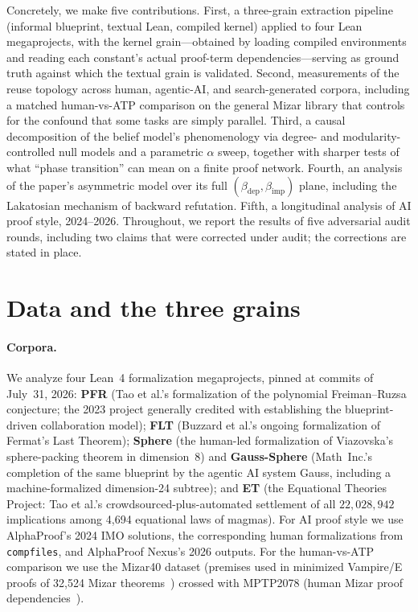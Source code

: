 \documentclass[11pt]{article}
\newcommand{\betadep}{\beta_{\mathrm{dep}}}
\newcommand{\betaimp}{\beta_{\mathrm{imp}}}
\begin{document}
Concretely, we make five contributions. First, a three-grain extraction pipeline (informal
blueprint, textual Lean, compiled kernel) applied to four Lean megaprojects, with the kernel
grain---obtained by loading compiled environments and reading each constant's actual proof-term
dependencies---serving as ground truth against which the textual grain is validated. Second,
measurements of the reuse topology across human, agentic-AI, and search-generated corpora,
including a matched human-vs-ATP comparison on the general Mizar library that controls for the
confound that some tasks are simply parallel. Third, a causal decomposition of the belief
model's phenomenology via degree- and modularity-controlled null models and a parametric
$\alpha$ sweep, together with sharper tests of what ``phase transition'' can mean on a finite
proof network. Fourth, an analysis of the paper's asymmetric model over its full
$(\betadep,\betaimp)$ plane, including the Lakatosian mechanism of backward refutation. Fifth,
a longitudinal analysis of AI proof style, 2024--2026. Throughout, we report the results of five
adversarial audit rounds, including two claims that were corrected under audit; the corrections
are stated in place.

\section{Data and the three grains}
\label{sec:data}

\paragraph{Corpora.} We analyze four Lean~4 formalization megaprojects, pinned at commits of
July~31, 2026: \textbf{PFR} (Tao et al.'s formalization of the polynomial Freiman--Ruzsa
conjecture; the 2023 project generally credited with establishing the blueprint-driven
collaboration model); \textbf{FLT} (Buzzard et al.'s ongoing formalization of Fermat's Last
Theorem); \textbf{Sphere} (the human-led formalization of Viazovska's sphere-packing theorem in
dimension~8) and \textbf{Gauss-Sphere} (Math~Inc.'s completion of the same blueprint by the
agentic AI system Gauss, including a machine-formalized dimension-24 subtree); and \textbf{ET}
(the Equational Theories Project: Tao et al.'s crowdsourced-plus-automated settlement of all
$22{,}028{,}942$ implications among 4{,}694 equational laws of magmas). For AI proof style we
use AlphaProof's 2024 IMO solutions, the corresponding human formalizations from
\texttt{compfiles}, and AlphaProof Nexus's 2026 outputs. For the human-vs-ATP comparison we use
the Mizar40 dataset (premises used in minimized Vampire/E proofs of 32{,}524 Mizar
theorems~\cite{kaliszyk2015}) crossed with MPTP2078 (human Mizar proof
dependencies~\cite{alama2014}).
\end{document}
